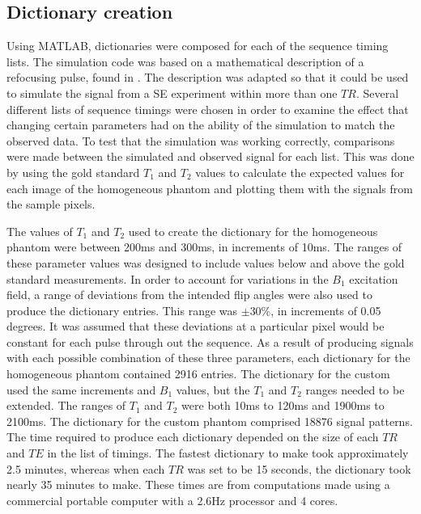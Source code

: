 \documentclass[journal]{IEEEtran}
\begin{document}
\subsection{Dictionary creation}


Using MATLAB, dictionaries were composed for each of the sequence timing lists. The simulation code was based on a mathematical description of a refocusing pulse, found in \cite{bernstein2004handbook}. The description was adapted so that it could be used to simulate the signal from a SE experiment within more than one $TR$.
Several different lists of sequence timings were chosen in order to examine the effect that changing certain parameters had on the ability of the simulation to match the observed data. To test that the simulation was working correctly, comparisons were made between the simulated and observed signal for each list. This was done by using the gold standard $T_1$ and $T_2$ values to calculate the expected values for each image of the homogeneous phantom and plotting them with the signals from the sample pixels.

The values of $T_1$ and $T_2$ used to create the dictionary for the homogeneous phantom were between 200ms and 300ms, in increments of 10ms. The ranges of these parameter values was designed to include values below and above the gold standard measurements. In order to account for variations in the $B_1$ excitation field, a range of deviations from the intended flip angles were also used to produce the dictionary entries. This range was $\pm$30\%, in increments of 0.05 degrees. It was assumed that these deviations at a particular pixel would be constant for each pulse through out the sequence.  As a result of producing signals with each possible combination of these three parameters, each dictionary for the homogeneous phantom contained 2916 entries. The dictionary for the custom used the same increments and $B_1$ values, but the $T_1$ and $T_2$ ranges needed to be extended. The ranges of $T_1$ and $T_2$ were both 10ms to 120ms and 1900ms to 2100ms. The dictionary for the custom phantom comprised 18876 signal patterns.
The time required to produce each dictionary depended on the size of each $TR$ and $TE$ in the list of timings. The fastest dictionary to make took approximately 2.5 minutes, whereas when each $TR$ was set to be 15 seconds, the dictionary took nearly 35 minutes to make. These times are from computations made using a commercial portable computer with a 2.6Hz processor and 4 cores.
\end{document}
